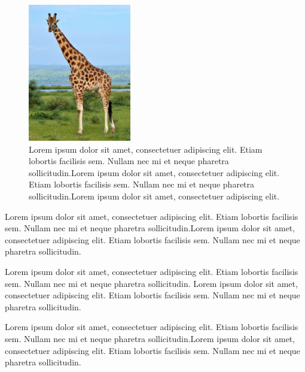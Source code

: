 \documentclass[12pt]{article}
\begin{document}
\begin{figure}
  \caption{Lorem ipsum dolor sit amet, consectetuer adipiscing elit. 
Etiam lobortis facilisis sem. Nullam nec mi et neque pharetra sollicitudin.Lorem ipsum dolor sit amet, consectetuer adipiscing elit. Etiam lobortis facilisis sem. Nullam nec mi et neque pharetra sollicitudin.Lorem ipsum dolor sit amet, consectetuer adipiscing elit.
}
  \includegraphics[width=0.4\textwidth]{./giraffe.jpg}
\end{figure}




\newpage


Lorem ipsum dolor sit amet, consectetuer adipiscing elit. 
Etiam lobortis facilisis sem. Nullam nec mi et neque pharetra sollicitudin.Lorem ipsum dolor sit amet, consectetuer adipiscing elit. Etiam lobortis facilisis sem. Nullam nec mi et neque pharetra sollicitudin.

Lorem ipsum dolor sit amet, consectetuer adipiscing elit. Etiam lobortis facilisis sem. Nullam nec mi et neque pharetra sollicitudin. Lorem ipsum dolor sit amet, consectetuer adipiscing elit. Etiam lobortis facilisis sem. Nullam nec mi et neque pharetra sollicitudin.

Lorem ipsum dolor sit amet, consectetuer adipiscing elit. Etiam lobortis facilisis sem. Nullam nec mi et neque pharetra sollicitudin.Lorem ipsum dolor sit amet, consectetuer adipiscing elit. Etiam lobortis facilisis sem. Nullam nec mi et neque pharetra sollicitudin.


\end{document}
